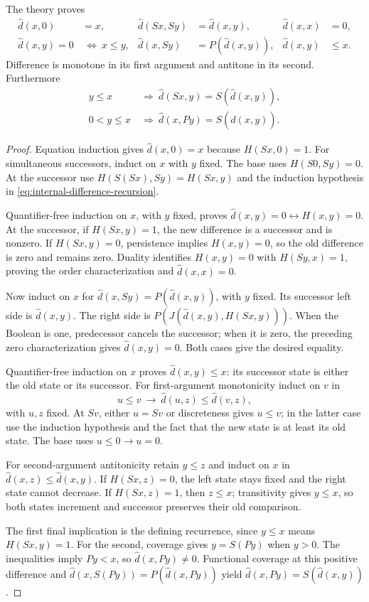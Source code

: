 \begin{lemma}
\label{lem:internal-difference}
The theory proves
\begin{align*}
 \widehat d(x,0)&=x,& \widehat d(Sx,Sy)&=\widehat d(x,y),&\widehat d(x,x)&=0,\\
 \widehat d(x,y)=0&\ \Longleftrightarrow\ x\le y,
 &\widehat d(x,Sy)&=P(\widehat d(x,y)),&\widehat d(x,y)&\le x.
\end{align*}
Difference is monotone in its first argument and antitone in its second.
Furthermore
\begin{align*}
 y\le x&\ \Longrightarrow\ \widehat d(Sx,y)=S(\widehat d(x,y)),\\
 0<y\le x&\ \Longrightarrow\ \widehat d(x,Py)=S(\widehat d(x,y)).
\end{align*}
\end{lemma}
\begin{proof}
Equation induction gives $\widehat d(x,0)=x$ because $H(Sx,0)=1$.
For simultaneous successors, induct on $x$ with $y$ fixed.  The base
uses $H(S0,Sy)=0$.  At the successor use
$H(S(Sx),Sy)=H(Sx,y)$ and the induction hypothesis in
\eqref{eq:internal-difference-recursion}.

Quantifier-free induction on $x$, with $y$ fixed, proves
$\widehat d(x,y)=0\leftrightarrow H(x,y)=0$.
At the successor, if $H(Sx,y)=1$, the new difference is a successor and
is nonzero.  If $H(Sx,y)=0$, persistence implies $H(x,y)=0$, so the old
difference is zero and remains zero.  Duality identifies $H(x,y)=0$
with $H(Sy,x)=1$, proving the order characterization and $\widehat d(x,x)=0$.

Now induct on $x$ for $\widehat d(x,Sy)=P(\widehat d(x,y))$, with $y$ fixed.  Its successor
left side is $\widehat d(x,y)$.  The right side is
$P(J(\widehat d(x,y),H(Sx,y)))$.  When the Boolean is one, predecessor cancels
the successor; when it is zero, the preceding zero characterization
gives $\widehat d(x,y)=0$.  Both cases give the desired equality.

Quantifier-free induction on $x$ proves $\widehat d(x,y)\le x$: its successor
state is either the old state or its successor.  For first-argument
monotonicity induct on $v$ in
\[
       u\le v\ \longrightarrow\ \widehat d(u,z)\le \widehat d(v,z),
\]
with $u,z$ fixed.  At $Sv$, either $u=Sv$ or discreteness gives $u\le v$;
in the latter case use the induction hypothesis and the fact that the
new state is at least its old state.  The base uses $u\le0\to u=0$.

For second-argument antitonicity retain $y\le z$ and induct on $x$ in
$\widehat d(x,z)\le \widehat d(x,y)$.  If $H(Sx,z)=0$, the left state stays fixed and
the right state cannot decrease.  If $H(Sx,z)=1$, then $z\le x$;
transitivity gives $y\le x$, so both states increment and successor
preserves their old comparison.

The first final implication is the defining recurrence, since
$y\le x$ means $H(Sx,y)=1$.  For the second, coverage gives
$y=S(Py)$ when $y>0$.  The inequalities imply $Py<x$, so
$\widehat d(x,Py)\ne0$.  Functional coverage at this positive difference and
$\widehat d(x,S(Py))=P(\widehat d(x,Py))$ yield
$\widehat d(x,Py)=S(\widehat d(x,y))$.
\end{proof}

